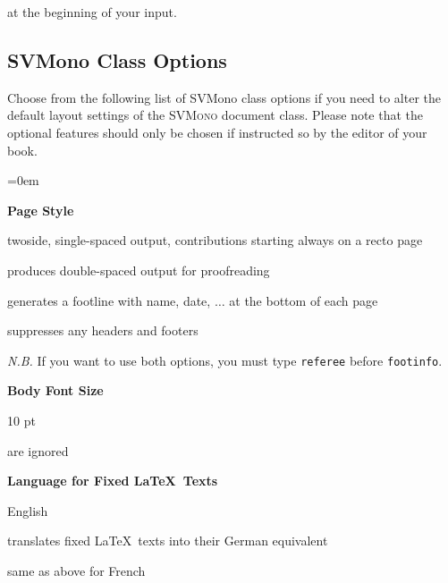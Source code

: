 \documentclass[graybox,square]{svmono}
\begin{document}
\begin{sloppy}
at the beginning of your input.

\vspace*{-6pt}

\subsection{SVMono Class Options}\label{subsec:2}
Choose from the following list of {\sc SVMono} class options if you need to alter the default
layout settings of the \textsc{SVMono} document class. Please note that the
optional features should only be chosen if instructed so by the editor of your
book.


\parskip=0em%

\bigskip\textbf{Page Style}

\begin{description}
\item[\textit{default}] twoside, single-spaced output, contributions starting always on a recto page
\item[\textit{referee}] produces double-spaced output for proofreading
\item[\textit{footinfo}] generates a footline with name, date, $\ldots$ at the bottom of each page
\item[\textit{norunningheads}] suppresses any headers and footers
\end{description}

\textit{N.B.} If you want to use both options, you must type \texttt{referee} before \texttt{footinfo}.


\bigskip\textbf{Body Font Size}

\begin{description}[\textit{11pt, 12pt}]
\item[\textit{default}] 10 pt
\item[\textit{11pt, 12pt}] are ignored
\end{description}


\bigskip\textbf{Language for Fixed \LaTeX\ Texts}



\begin{description}
\item[\textit{default}] English
\item[\textit{deutsch}] translates fixed \LaTeX\ texts into their German equivalent
\item[\textit{francais}] same as above for French
\end{description}



\end{sloppy}
\end{document}
